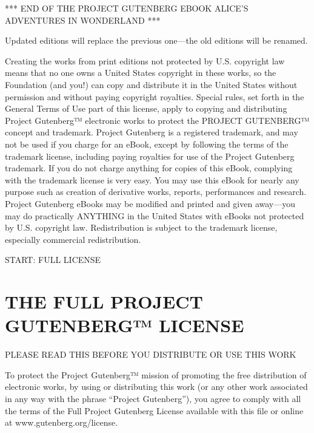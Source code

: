 \documentclass[11pt,openany,oneside]{book}
\begin{document}
{

}

*** END OF THE PROJECT GUTENBERG EBOOK ALICE'S ADVENTURES IN WONDERLAND *** 

Updated editions will replace the previous one—the old editions will be renamed. 

Creating the works from print editions not protected by U.S. copyright law means that no one owns a United States copyright in these works, so the Foundation (and you!) can copy and distribute it in the United States without permission and without paying copyright royalties. Special rules, set forth in the General Terms of Use part of this license, apply to copying and distributing Project Gutenberg™ electronic works to protect the PROJECT GUTENBERG™ concept and trademark. Project Gutenberg is a registered trademark, and may not be used if you charge for an eBook, except by following the terms of the trademark license, including paying royalties for use of the Project Gutenberg trademark. If you do not charge anything for copies of this eBook, complying with the trademark license is very easy. You may use this eBook for nearly any purpose such as creation of derivative works, reports, performances and research. Project Gutenberg eBooks may be modified and printed and given away—you may do practically ANYTHING in the United States with eBooks not protected by U.S. copyright law. Redistribution is subject to the trademark license, especially commercial redistribution. 

START: FULL LICENSE


\clearpage{}
{}
\chapter*{THE FULL PROJECT GUTENBERG™ LICENSE}
\leavevmode\hypertarget{d17.fp206921}{}PLEASE READ THIS BEFORE YOU DISTRIBUTE OR USE THIS WORK 

To protect the Project Gutenberg™ mission of promoting the free distribution of electronic works, by using or distributing this work (or any other work associated in any way with the phrase “Project Gutenberg”), you agree to comply with all the terms of the Full Project Gutenberg License available with this file or online at www.gutenberg.org/license. 
\end{document}
